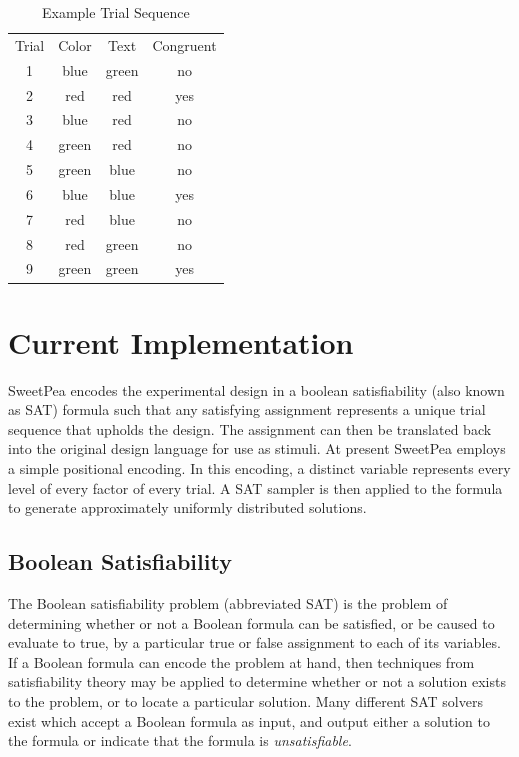 \begin{table}[htb]
  \centering
  \caption{Example Trial Sequence}
\begin{tabular}{cccc}
Trial & Color & Text  & Congruent \\
1     & blue  & green & no        \\
2     & red   & red   & yes       \\
3     & blue  & red   & no        \\
4     & green & red   & no        \\
5     & green & blue  & no        \\
6     & blue  & blue  & yes       \\
7     & red   & blue  & no        \\
8     & red   & green & no        \\
9     & green & green & yes
\end{tabular}
\label{tab:example_sequence}
\end{table}


\section{Current Implementation}

SweetPea encodes the experimental design in a boolean satisfiability (also known as SAT) formula such that any satisfying assignment represents a unique trial sequence that upholds the design. The assignment can then be translated back into the original design language for use as stimuli. At present SweetPea employs a simple positional encoding. In this encoding, a distinct variable represents every level of every factor of every trial. A SAT sampler is then applied to the formula to generate approximately uniformly distributed solutions.

\subsection{Boolean Satisfiability}

The Boolean satisfiability problem (abbreviated SAT) is the problem of determining whether or not a Boolean formula can be satisfied, or be caused to evaluate to true, by a particular true or false assignment to each of its variables. If a Boolean formula can encode the problem at hand, then techniques from satisfiability theory may be applied to determine whether or not a solution exists to the problem, or to locate a particular solution. Many different SAT solvers exist which accept a Boolean formula as input, and output either a solution to the formula or indicate that the formula is \textit{unsatisfiable}.

